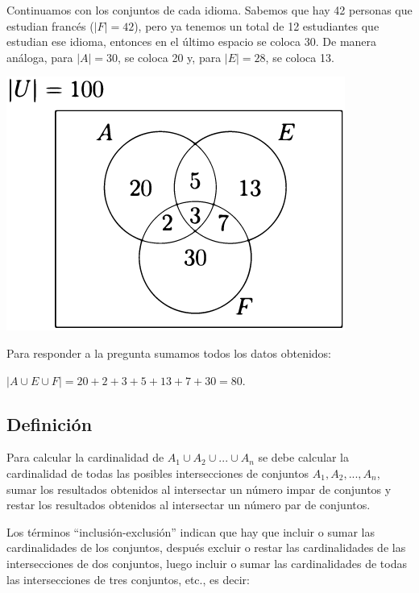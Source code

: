\documentclass[12pt]{article}
\begin{document}
\begin{solucion}
    Continuamos con los conjuntos de cada idioma.  Sabemos que hay 42 personas  que  estudian  francés ($|F|=42$), pero  ya  tenemos  un  total de  12  estudiantes  que  estudian  ese  idioma,  entonces  en  el último espacio se coloca 30.  De manera análoga, para $|A|=30$, se coloca 20 y, para $|E|=28$, se coloca 13.
    
    \begin{center}
        \includegraphics[scale=0.5]{Imagenes/IMG7/Venn3.png}
    \end{center}

    Para responder a la pregunta sumamos todos los datos obtenidos:

    \begin{center}
        $|A \cup E \cup F|=20+2+3+5+13+7+30=80$.
    \end{center}
\end{solucion}

\subsection{Definición}

Para calcular la cardinalidad de $A_1 \cup A_2 \cup ... \cup A_n$ se debe calcular la cardinalidad de todas las posibles intersecciones de conjuntos $A_1, A_2, ..., A_n$, sumar los resultados obtenidos al intersectar un número impar de conjuntos y restar los resultados obtenidos al intersectar un número par de conjuntos.

Los términos “inclusión-exclusión” indican que hay que incluir o sumar las cardinalidades de los conjuntos, después excluir o restar las cardinalidades de las intersecciones de dos conjuntos, luego incluir o sumar las cardinalidades de todas las intersecciones de tres conjuntos, etc., es decir:
\end{document}
